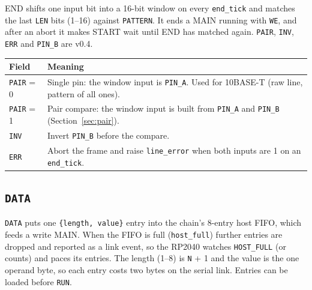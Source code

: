 \documentclass[11pt,a4paper]{article}
\newcommand{\new}{\textcolor{newc}{\textsf{\small v0.4}}}
\newcommand{\sig}[1]{\texttt{#1}}
\begin{document}
END shifts one input bit into a 16-bit window on every \sig{end\_tick} and matches the last \sig{LEN} bits (1--16) against \sig{PATTERN}. It ends a MAIN running with \sig{WE}, and after an abort it makes START wait until END has matched again. \sig{PAIR}, \sig{INV}, \sig{ERR} and \sig{PIN\_B} are \new.

\begin{tabularx}{\linewidth}{@{}l>{\raggedright\arraybackslash}X@{}}
\toprule
Field & Meaning \\
\midrule
\sig{PAIR} = 0 & Single pin: the window input is \sig{PIN\_A}. Used for 10BASE-T (raw line, pattern of all ones). \\
\sig{PAIR} = 1 & Pair compare: the window input is built from \sig{PIN\_A} and \sig{PIN\_B} (Section~\ref{sec:pair}). \\
\sig{INV} & Invert \sig{PIN\_B} before the compare. \\
\sig{ERR} & Abort the frame and raise \sig{line\_error} when both inputs are 1 on an \sig{end\_tick}. \\
\bottomrule
\end{tabularx}

\subsection{\sig{DATA}}

\sig{DATA} puts one \texttt{\{length, value\}} entry into the chain's 8-entry host FIFO, which feeds a write MAIN. When the FIFO is full (\sig{host\_full}) further entries are dropped and reported as a link event, so the RP2040 watches \sig{HOST\_FULL} (or counts) and paces its entries. The length (1--8) is \sig{N} + 1 and the value is the one operand byte, so each entry costs two bytes on the serial link. Entries can be loaded before \sig{RUN}.
\end{document}
